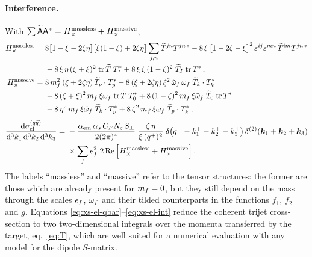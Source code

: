 \paragraph{Interference.} With $\sum\widetilde{\mathsf{A}}\mathsf{A}^*=H_\times^{\rm massless}+H_\times^{\rm massive}$,
\begin{align}
H_\times^{\rm massless}={}&8\big[1-\xi-2\zeta\eta\big]\big[\xi(1-\xi)+2\zeta\eta\big]\sum_{j,n}\widetilde T^{jn}T^{jn\,*}
-8\,\xi\,\big[1-2\zeta-\xi\big]^2\,\varepsilon^{ij}\varepsilon^{mn}\,\widetilde T^{im}T^{jn\,*}
\nonumber\\
&-8\,\xi\,\eta\,(\zeta+\xi)^2\;{\rm tr}\,\widetilde T\;T_I^*+8\,\xi\,\zeta\,(1-\zeta)^2\;\widetilde T_I\;{\rm tr}\,T^*\,,
\nonumber\\
H_\times^{\rm massive}={}&8\,m_f^2\,(\xi+2\zeta\eta)\,\widetilde T_p\cdot T_p^*
-8\,(\xi+2\zeta\eta)\,\xi^2\,\tilde{\omega}_f\,\omega_f\;\widetilde T_k\cdot T_k^*
\nonumber\\
&-8\,(\zeta+\xi)^2\,m_f\,\xi\omega_f\;{\rm tr}\,\widetilde T\;T_0^*+8\,(1-\zeta)^2\,m_f\,\xi\tilde{\omega}_f\;\widetilde T_0\;{\rm tr}\,T^*
\nonumber\\
&-8\,\eta^2\,m_f\,\xi\tilde{\omega}_f\;\widetilde T_k\cdot T_p^*+8\,\zeta^2\,m_f\,\xi\omega_f\;\widetilde T_p\cdot T_k^*\,,
\label{eq:H-el-int}
\end{align}
\begin{align}
\frac{{\rm d}\sigma^{(q\bar q)}_{\rm el}}{{\rm d}^3k_1\,{\rm d}^3k_2\,{\rm d}^3k_3}={}&-
\frac{\alpha_{\rm em}\,\alpha_s\,C_FN_c\,S_\perp}{2(2\pi)^{4}}\;\frac{\zeta\,\eta}{\xi\,(q^+)^2}\;
\delta\big(q^+-k_1^+-k_2^+-k_3^+\big)\,\delta^{(2)}(\bm{k}_1+\bm{k}_2+\bm{k}_3)
\nonumber\\
&\times\sum_fe_f^2\;2\,{\rm Re}\,\Big[H_\times^{\rm massless}+H_\times^{\rm massive}\Big]\,.
\label{eq:xs-el-int}
\end{align}
The labels ``massless'' and ``massive'' refer to the tensor structures: the former are those which are
already present for $m_f=0$, but they still depend on the mass through the scales $\epsilon_f$, $\omega_f$ and
their tilded counterparts in the functions $f_1$, $f_2$ and $g$. Equations
\eqref{eq:xs-el-qbar}--\eqref{eq:xs-el-int} reduce the coherent trijet cross-section to two
two-dimensional integrals over the momenta transferred by the target, eq.~\eqref{eq:T}, which are well
suited for a numerical evaluation with any model for the dipole $S$-matrix.
